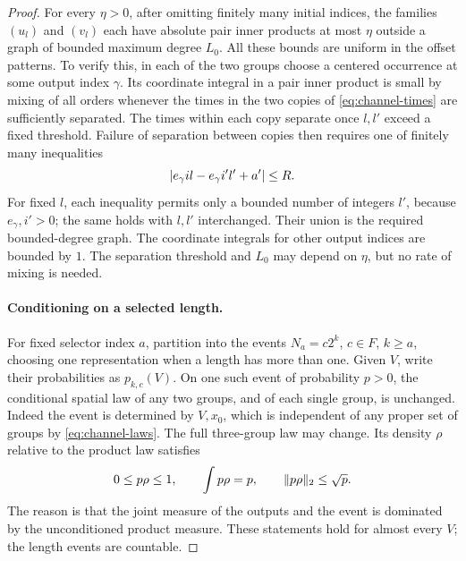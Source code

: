 \begin{proof}
For every $\eta>0$, after omitting finitely many initial indices, the
families $(u_l)$ and $(v_l)$ each have absolute pair inner products at
most $\eta$ outside a graph of bounded maximum degree $L_0$.
All these bounds are uniform in the offset patterns.  To verify this,
in each of the two groups choose a centered occurrence at some output
index $\gamma$.  Its coordinate integral in a pair inner product is
small by mixing of all orders whenever the times in the two copies of
\eqref{eq:channel-times} are sufficiently separated.  The times within
each copy separate once $l,l'$ exceed a fixed threshold.  Failure of
separation between copies then requires one of finitely many inequalities
\[
 \lvert e_\gamma i l-e_\gamma i'l'+a'\rvert\le R.
\]
For fixed $l$, each inequality permits only a bounded number of
integers $l'$, because $e_\gamma,i'>0$; the same holds with $l,l'$
interchanged.  Their union is the required bounded-degree graph.
The coordinate integrals for other output indices are bounded by $1$.
The separation threshold and $L_0$ may depend on $\eta$, but no rate
of mixing is needed.

\paragraph{Conditioning on a selected length.}
For fixed selector index $a$, partition into the events
$N_a=c2^k$, $c\in F$, $k\ge a$, choosing one representation when a
length has more than one.  Given $V$, write their probabilities as
$p_{k,c}(V)$.  On one such event of probability $p>0$, the conditional
spatial law of any two groups, and of each single group, is unchanged.
Indeed the event is determined by $V,x_0$, which is independent of any
proper set of groups by \eqref{eq:channel-laws}.  The full three-group
law may change.  Its density $\rho$ relative to the product law satisfies
\begin{equation}\label{eq:channel-density}
 0\le p\rho\le1,\qquad
 \int p\rho=p,\qquad \lVert p\rho\rVert_2\le\sqrt p.
\end{equation}
The reason is that the joint measure of the outputs and the event is
dominated by the unconditioned product measure.  These statements hold
for almost every $V$; the length events are countable.


\end{proof}
